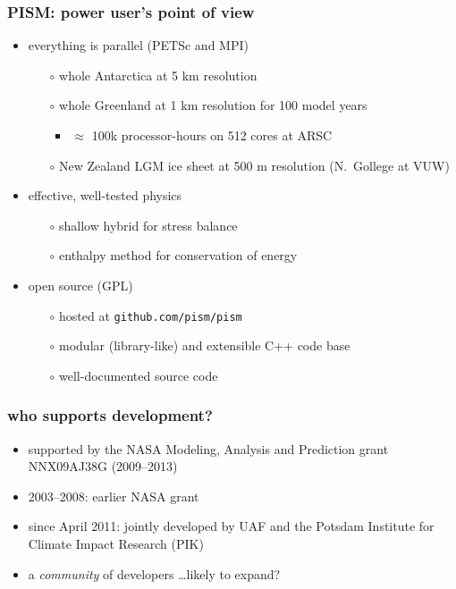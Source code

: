 \documentclass[hide notes,intlimits]{beamer}
\begin{document}
\begin{frame}
  \frametitle{PISM: power user's point of view}
  \begin{itemize}
  \item everything is parallel (PETSc and MPI)
    \begin{itemize}
    \item[$\circ$] whole Antarctica at 5 km resolution
    \item[$\circ$] whole Greenland at 1 km resolution for 100 model years
      \begin{itemize}
      \item $\approx$ 100k processor-hours on 512 cores at ARSC
      \end{itemize}
    \item[$\circ$] New Zealand LGM ice sheet at 500 m resolution (N.~Gollege at VUW)
    \end{itemize}
  \item effective, well-tested physics
    \begin{itemize}
    \item[$\circ$] shallow hybrid for stress balance
    \item[$\circ$] enthalpy method for conservation of energy
    \end{itemize}
  \item open source (GPL)
    \begin{itemize}
    \item[$\circ$] hosted at \texttt{github.com/pism/pism}
    \item[$\circ$] modular (library-like) and extensible C++ code base
    \item[$\circ$] well-documented source code
    \end{itemize}
  \end{itemize}
\end{frame}


\begin{frame}
  \frametitle{who supports development?}
  \begin{itemize}
  \item supported by the NASA Modeling, Analysis and Prediction grant NNX09AJ38G
   (2009--2013)
  \item 2003--2008: earlier NASA grant
  \item since April 2011: jointly developed by UAF and the Potsdam
    Institute for Climate Impact Research (PIK)
  \item a \emph{community} of developers \dots likely to expand?
  \end{itemize}
\end{frame}
\end{document}
